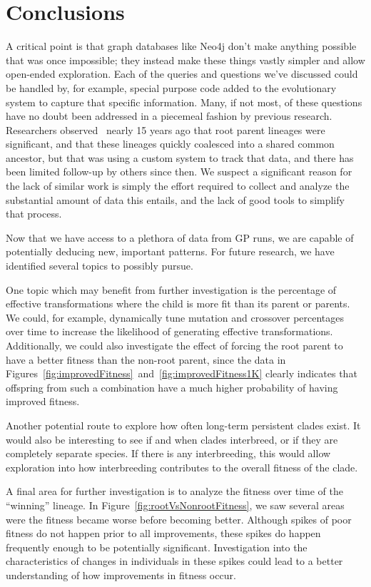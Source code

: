 \documentclass[12pt]{article}
\begin{document}
\section{Conclusions} \label{sec:conclusion}

A critical point is that graph databases like Neo4j don't make anything possible that was once impossible; they instead make these things vastly simpler and allow open-ended exploration. Each of the queries and questions we've discussed could be handled by, for example, special purpose code added to the evolutionary system to capture that specific information. Many, if not most, of these questions have no doubt been addressed in a piecemeal fashion by previous research. Researchers observed~\cite{mcphee1999analysis} nearly 15 years ago that root parent lineages were significant, and that these lineages quickly coalesced into a shared common ancestor, but that was using a custom system to track that data, and there has been limited follow-up by others since then. We suspect a significant reason for the lack of similar work is simply the effort required to collect and analyze the substantial amount of data this entails, and the lack of good tools to simplify that process.

Now that we have access to a plethora of data from GP runs, we are capable of potentially deducing new, important patterns. For future research, we have identified several topics to possibly pursue.

One topic which may benefit from further investigation is the percentage of effective transformations where the child is more fit than its parent or parents. We could, for example, dynamically tune mutation and crossover percentages over time to increase the likelihood of generating effective transformations. Additionally, we could also investigate the effect of forcing the root parent to have a better fitness than the non-root parent, since the data in Figures~\ref{fig:improvedFitness}~and~\ref{fig:improvedFitness1K} clearly indicates that offspring from such a combination have a much higher probability of having improved fitness.

Another potential route to explore how often long-term persistent clades exist. It would also be interesting to see if and when clades interbreed, or if they are completely separate species. If there is any interbreeding, this would allow exploration into how interbreeding contributes to the overall fitness of the clade.

A final area for further investigation is to analyze the fitness over time of the ``winning'' lineage. In Figure~\ref{fig:rootVsNonrootFitness}, we saw several areas were the fitness became worse before becoming better. Although spikes of poor fitness do not happen prior to all improvements, these spikes do happen frequently enough to be potentially significant. Investigation into the characteristics of changes in individuals in these spikes could lead to a better understanding of how improvements in fitness occur.
\end{document}
